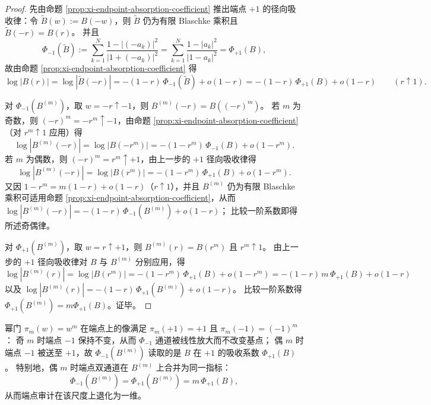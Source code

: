 \begin{proof}
先由命题 \ref{prop:xi-endpoint-absorption-coefficient} 推出端点 \(+1\) 的径向吸收律：令 \(\widetilde B(w):=B(-w)\)，则 \(\widetilde B\) 仍为有限 Blaschke 乘积且 \(\widetilde B(-r)=B(r)\)。
并且
\[
\Phi_{-1}(\widetilde B)
:=\sum_{k=1}^{N}\frac{1-|(-a_k)|^2}{|1+(-a_k)|^2}
=\sum_{k=1}^{N}\frac{1-|a_k|^2}{|1-a_k|^2}
=\Phi_{+1}(B),
\]
故由命题 \ref{prop:xi-endpoint-absorption-coefficient} 得
\[
\log|B(r)|
=\log|\widetilde B(-r)|
=-(1-r)\,\Phi_{-1}(\widetilde B)+o(1-r)
=-(1-r)\,\Phi_{+1}(B)+o(1-r)
\qquad(r\uparrow 1).
\]
\par
对 \(\Phi_{-1}(B^{(m)})\)，取 \(w=-r\uparrow-1\)，则
\(
B^{(m)}(-r)=B((-r)^m)
\)。
若 \(m\) 为奇数，则 \((-r)^m=-r^m\uparrow-1\)，由命题 \ref{prop:xi-endpoint-absorption-coefficient}（对 \(r^m\uparrow 1\) 应用）得
\[
\log|B^{(m)}(-r)|=\log|B(-r^m)|=-(1-r^m)\,\Phi_{-1}(B)+o(1-r^m).
\]
若 \(m\) 为偶数，则 \((-r)^m=r^m\uparrow+1\)，由上一步的 \(+1\) 径向吸收律得
\[
\log|B^{(m)}(-r)|=\log|B(r^m)|=-(1-r^m)\,\Phi_{+1}(B)+o(1-r^m).
\]
又因 \(1-r^m=m(1-r)+o(1-r)\)（\(r\uparrow 1\)），并且 \(B^{(m)}\) 仍为有限 Blaschke 乘积可适用命题 \ref{prop:xi-endpoint-absorption-coefficient}，从而
\(
\log|B^{(m)}(-r)|=-(1-r)\,\Phi_{-1}(B^{(m)})+o(1-r)
\)；
比较一阶系数即得所述奇偶律。
\par
对 \(\Phi_{+1}(B^{(m)})\)，取 \(w=r\uparrow+1\)，则 \(B^{(m)}(r)=B(r^m)\) 且 \(r^m\uparrow 1\)。
由上一步的 \(+1\) 径向吸收律对 \(B\) 与 \(B^{(m)}\) 分别应用，得
\[
\log|B^{(m)}(r)|
=\log|B(r^m)|
=-(1-r^m)\,\Phi_{+1}(B)+o(1-r^m)
=-(1-r)\,m\,\Phi_{+1}(B)+o(1-r)
\]
以及
\(
\log|B^{(m)}(r)|=-(1-r)\,\Phi_{+1}(B^{(m)})+o(1-r)
\)。
比较一阶系数得 \(\Phi_{+1}(B^{(m)})=m\Phi_{+1}(B)\)。证毕。
\end{proof}

\begin{remark}[奇偶性与端点通道的退化/合并]\label{rem:xi-endpoint-absorption-adams-parity}
幂门 \(\pi_m(w)=w^m\) 在端点上的像满足 \(\pi_m(+1)=+1\) 且 \(\pi_m(-1)=(-1)^m\)：
奇 \(m\) 时端点 \(-1\) 保持不变，从而 \(\Phi_{-1}\) 通道被线性放大而不改变基点；
偶 \(m\) 时端点 \(-1\) 被送至 \(+1\)，故 \(\Phi_{-1}(B^{(m)})\) 读取的是 \(B\) 在 \(+1\) 的吸收系数 \(\Phi_{+1}(B)\)。
特别地，偶 \(m\) 时端点双通道在 \(B^{(m)}\) 上合并为同一指标：
\[
\Phi_{-1}(B^{(m)})=\Phi_{+1}(B^{(m)})=m\,\Phi_{+1}(B),
\]
从而端点审计在该尺度上退化为一维。
\end{remark}

